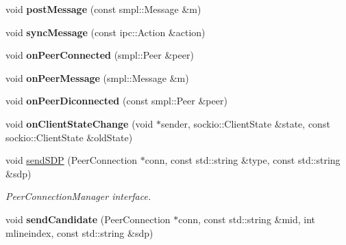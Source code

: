 \begin{DoxyCompactItemize}
\mbox{\label{classscy_1_1_signaler_a91080ecc1ee1ed673568d25cf54f04e3}} 
void {\bfseries post\+Message} (const smpl\+::\+Message \&m)
\item 
\mbox{\label{classscy_1_1_signaler_a5a9e9eed49e46efd024ac982fdb5385d}} 
void {\bfseries sync\+Message} (const ipc\+::\+Action \&action)
\item 
\mbox{\label{classscy_1_1_signaler_a6f74997146bf66ed82f460ff027731ff}} 
void {\bfseries on\+Peer\+Connected} (smpl\+::\+Peer \&peer)
\item 
\mbox{\label{classscy_1_1_signaler_af5e47226a7227c15f2e8927f9b91cef8}} 
void {\bfseries on\+Peer\+Message} (smpl\+::\+Message \&m)
\item 
\mbox{\label{classscy_1_1_signaler_a053e9a7140fcd0af2220c3d4d9eed533}} 
void {\bfseries on\+Peer\+Diconnected} (const smpl\+::\+Peer \&peer)
\item 
\mbox{\label{classscy_1_1_signaler_abcb13e297f846fd0b70120b194ef1ef6}} 
void {\bfseries on\+Client\+State\+Change} (void $\ast$sender, sockio\+::\+Client\+State \&state, const sockio\+::\+Client\+State \&old\+State)
\item 
\mbox{\label{classscy_1_1_signaler_a6372641d434cb42e5db3472f5f02fb51}} 
void \hyperlink{classscy_1_1_signaler_a6372641d434cb42e5db3472f5f02fb51}{send\+S\+DP} (Peer\+Connection $\ast$conn, const std\+::string \&type, const std\+::string \&sdp)
\begin{DoxyCompactList}\small\item\em Peer\+Connection\+Manager interface. \end{DoxyCompactList}\item 
\mbox{\label{classscy_1_1_signaler_a0b5d3bfd47e003e1803205adb40d9340}} 
void {\bfseries send\+Candidate} (Peer\+Connection $\ast$conn, const std\+::string \&mid, int mlineindex, const std\+::string \&sdp)
\item 
\mbox{\label{classscy_1_1_signaler_a73304df8397384383dec0a8fc816667a}} 

\end{DoxyCompactItemize}
